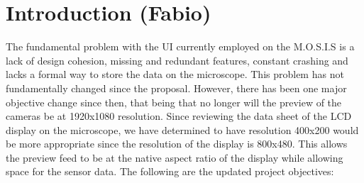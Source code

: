 \section{Introduction (Fabio)}
The fundamental problem with the UI currently employed on the M.O.S.I.S is a lack of design cohesion, missing and redundant features, constant crashing and lacks a formal way to store the data on the microscope. This problem has not fundamentally changed since the proposal. However, there has been one major objective change since then, that being that no longer will the preview of the cameras be at 1920x1080 resolution. Since reviewing the data sheet of the LCD display on the microscope, we have determined to have resolution 400x200 would be more appropriate since the resolution of the display is 800x480.\cite{5inchResistiveTouch} This allows the preview feed to be at the native aspect ratio of the display while allowing space for the sensor data. The following are the updated project objectives:
